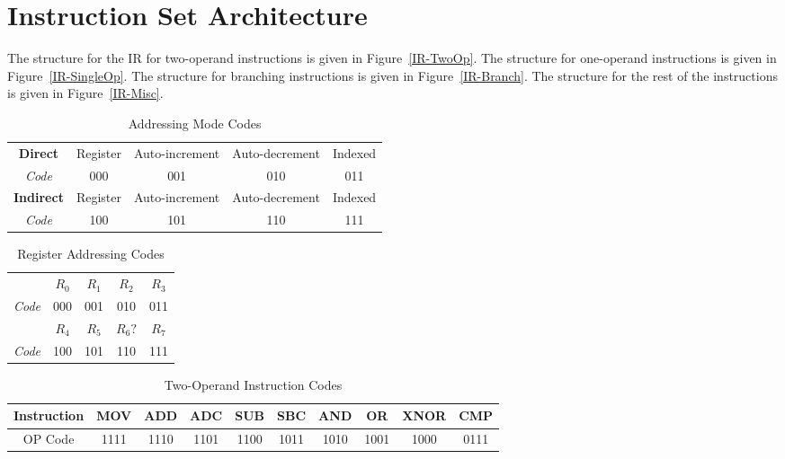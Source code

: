 \documentclass[12pt]{article}
\theoremstyle{plain}
\theoremstyle{definition}
\begin{document}
\section{Instruction Set Architecture}
    The structure for the IR for two-operand instructions is given in Figure~\ref{IR-TwoOp}. The structure for one-operand instructions is given in Figure~\ref{IR-SingleOp}. The structure for branching instructions is given in Figure~\ref{IR-Branch}. The structure for the rest of the instructions is given in Figure~\ref{IR-Misc}.
    \begin{table}[H]
        \centering
        \begin{tabular}{c|c|c|c|c|}
            \cline{2-5}
            \textbf{Direct}   & Register & Auto-increment & Auto-decrement & Indexed \\ \cline{2-5} 
            \textit{Code}     & 000      & 001            & 010            & 011     \\ \cline{2-5} 
            \textbf{Indirect} & Register & Auto-increment & Auto-decrement & Indexed \\ \cline{2-5} 
            \textit{Code}     & 100      & 101            & 110            & 111     \\ \cline{2-5} 
        \end{tabular}
        \caption{Addressing Mode Codes}
        \label{addr-mode-codes}
    \end{table}
    \begin{table}[H]
        \centering
        \begin{tabular}{c|c|c|c|c|}
            \cline{2-5}
                            & $R_0$ & $R_1$ & $R_2$ & $R_3$ \\ \cline{2-5} 
            \textit{Code}   & 000      & 001            & 010            & 011     \\ \cline{2-5} 
                            & $R_4$ & $R_5$ & $R_6?$ & $R_7$ \\ \cline{2-5} 
            \textit{Code}   & 100      & 101            & 110            & 111     \\ \cline{2-5} 
        \end{tabular}
        \caption{Register Addressing Codes}
        \label{reg-addr-codes}
    \end{table}
    \begin{table}[H]
        \centering
        \begin{tabular}{|c|c|c|c|c|c|c|c|c|c|}
        \hline
        Instruction & MOV  & ADD  & ADC  & SUB  & SBC  & AND  & OR   & XNOR & CMP  \\ \hline
        OP Code     & 1111 & 1110 & 1101 & 1100 & 1011 & 1010 & 1001 & 1000 & 0111 \\ \hline
        \end{tabular}
        \caption{Two-Operand Instruction Codes}
        \label{two-operand-op-codes}
    \end{table}
\end{document}
